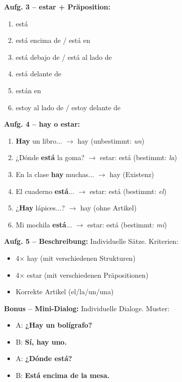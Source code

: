 \documentclass[11pt,a4paper]{article}
\newcommand{\es}[1]{\textbf{#1}}
\begin{document}
\vspace{0.3cm}

\textbf{Aufg. 3 -- estar + Präposition:}
\begin{enumerate}[label=\alph*), nosep]
    \item está
    \item está encima de / está en
    \item está debajo de / está al lado de
    \item está delante de
    \item están en
    \item estoy al lado de / estoy delante de
\end{enumerate}

\vspace{0.3cm}

\textbf{Aufg. 4 -- hay o estar:}
\begin{enumerate}[label=\alph*), nosep]
    \item \textbf{Hay} un libro... $\rightarrow$ hay (unbestimmt: \textit{un})
    \item ¿Dónde \textbf{está} la goma? $\rightarrow$ estar: está (bestimmt: \textit{la})
    \item En la clase \textbf{hay} muchas... $\rightarrow$ hay (Existenz)
    \item El cuaderno \textbf{está}... $\rightarrow$ estar: está (bestimmt: \textit{el})
    \item ¿\textbf{Hay} lápices...? $\rightarrow$ hay (ohne Artikel)
    \item Mi mochila \textbf{está}... $\rightarrow$ estar: está (bestimmt: \textit{mi})
\end{enumerate}

\vspace{0.3cm}

\textbf{Aufg. 5 -- Beschreibung:} Individuelle Sätze. Kriterien:
\begin{itemize}[nosep]
    \item 4× hay (mit verschiedenen Strukturen)
    \item 4× estar (mit verschiedenen Präpositionen)
    \item Korrekte Artikel (el/la/un/una)
\end{itemize}

\vspace{0.3cm}

\textbf{Bonus -- Mini-Dialog:} Individuelle Dialoge. Muster:
\begin{itemize}[nosep]
    \item A: \es{¿Hay un bolígrafo?}
    \item B: \es{Sí, hay uno.}
    \item A: \es{¿Dónde está?}
    \item B: \es{Está encima de la mesa.}
\end{itemize}
\end{document}
